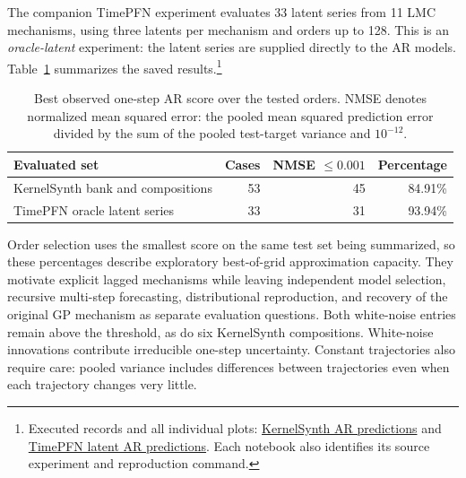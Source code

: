 The companion TimePFN experiment evaluates 33 latent series from 11 LMC
mechanisms, using three latents per mechanism and orders up to 128. This is an
\emph{oracle-latent} experiment: the latent series are supplied directly to
the AR models. Table~\ref{tab:implemented-ar-evidence} summarizes the saved
results.\footnote{Executed records and all individual plots:
\href{https://github.com/MateusWiteck/tsfmxai/blob/27ec9cf/experiments/autoregressive_process_coverage/01_kernelsynth_ar_prediction_results.ipynb}{KernelSynth AR predictions}
and
\href{https://github.com/MateusWiteck/tsfmxai/blob/27ec9cf/experiments/autoregressive_process_coverage/02_timepfn_lmc_ar_prediction_results.ipynb}{TimePFN latent AR predictions}.
Each notebook also identifies its source experiment and reproduction command.}

\begin{table}[H]
\centering\small
\begin{tabular}{@{}lrrr@{}}
\toprule
Evaluated set & Cases & NMSE $\leq 0.001$ & Percentage \\
\midrule
KernelSynth bank and compositions & 53 & 45 & 84.91\% \\
TimePFN oracle latent series & 33 & 31 & 93.94\% \\
\bottomrule
\end{tabular}
\caption{Best observed one-step AR score over the tested orders.
NMSE denotes normalized mean squared error: the pooled mean squared prediction
error divided by the sum of the pooled test-target variance and $10^{-12}$.}
\label{tab:implemented-ar-evidence}
\end{table}

Order selection uses the smallest score on the same test set being summarized,
so these percentages describe exploratory best-of-grid approximation capacity.
They motivate explicit lagged mechanisms while leaving independent model
selection, recursive multi-step forecasting, distributional reproduction, and
recovery of the original GP mechanism as separate evaluation questions. Both
white-noise entries remain above the threshold, as do six KernelSynth
compositions. White-noise innovations contribute irreducible one-step
uncertainty. Constant trajectories also require care: pooled variance includes
differences between trajectories even when each trajectory changes very little.
